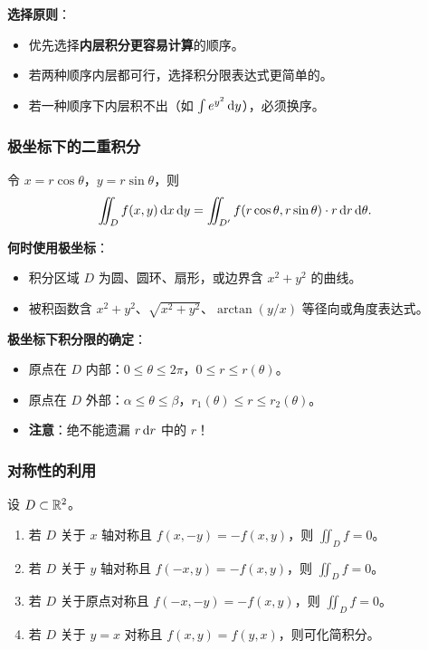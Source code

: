 \documentclass{ctexart}
\begin{document}
\textbf{选择原则}：
\begin{itemize}
  \item 优先选择\textbf{内层积分更容易计算}的顺序。
  \item 若两种顺序内层都可行，选择积分限表达式更简单的。
  \item 若一种顺序下内层积不出（如 $\int e^{y^2} \,\mathrm{d} y$），必须换序。
\end{itemize}

\subsubsection*{极坐标下的二重积分}

令 $x = r\cos\theta$，$y = r\sin\theta$，则
\[
  \iint_D f(x,y) \,\mathrm{d} x\,\mathrm{d} y
  = \iint_{D'} f(r\cos\theta, r\sin\theta) \cdot r \,\mathrm{d} r\,\mathrm{d} \theta.
\]

\textbf{何时使用极坐标}：
\begin{itemize}
  \item 积分区域 $D$ 为圆、圆环、扇形，或边界含 $x^2+y^2$ 的曲线。
  \item 被积函数含 $x^2+y^2$、$\sqrt{x^2+y^2}$、$\arctan(y/x)$ 等径向或角度表达式。
\end{itemize}

\textbf{极坐标下积分限的确定}：
\begin{itemize}
  \item 原点在 $D$ 内部：$0 \le \theta \le 2\pi$，$0 \le r \le r(\theta)$。
  \item 原点在 $D$ 外部：$\alpha \le \theta \le \beta$，$r_1(\theta) \le r \le r_2(\theta)$。
  \item \textbf{注意}：绝不能遗漏 $r \,\mathrm{d} r$ 中的 $r$！
\end{itemize}

\subsubsection*{对称性的利用}

设 $D \subset \mathbb{R}^2$。

\begin{proposition}[对称性与奇偶性]
  \begin{enumerate}
    \item 若 $D$ 关于 $x$ 轴对称且 $f(x,-y) = -f(x,y)$，则 $\iint_D f = 0$。
    \item 若 $D$ 关于 $y$ 轴对称且 $f(-x,y) = -f(x,y)$，则 $\iint_D f = 0$。
    \item 若 $D$ 关于原点对称且 $f(-x,-y) = -f(x,y)$，则 $\iint_D f = 0$。
    \item 若 $D$ 关于 $y=x$ 对称且 $f(x,y) = f(y,x)$，则可化简积分。
  \end{enumerate}
\end{proposition}
\end{document}
